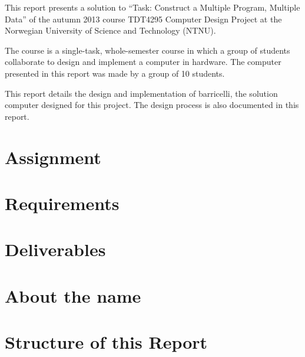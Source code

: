 This report presents a solution to ``Task: Construct a Multiple Program, Multiple Data'' of the autumn 2013 course TDT4295 Computer Design Project at the Norwegian University of Science and Technology (NTNU).

The course is a single-task, whole-semester course in which a group of students collaborate to design and implement a computer in hardware.
The computer presented in this report was made by a group of 10 students.

This report details the design and implementation of \Gls{barricelli}, the solution computer designed for this project.
The design process is also documented in this report.

\section{Assignment}



\section{Requirements}



\section{Deliverables}



\section{About the name}



\section{Structure of this Report}



